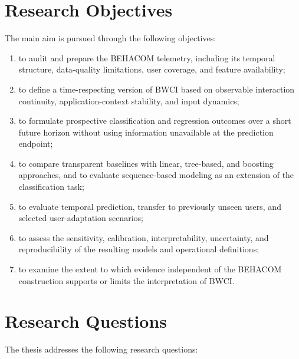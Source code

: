 \section{Research Objectives}
The main aim is pursued through the following objectives:

\begin{enumerate}
    \item to audit and prepare the BEHACOM telemetry, including its temporal structure, data-quality limitations, user coverage, and feature availability;
    
    \item to define a time-respecting version of BWCI based on observable interaction continuity, application-context stability, and input dynamics;

    \item to formulate prospective classification and regression outcomes over a short future horizon without using information unavailable at the prediction endpoint;

    \item to compare transparent baselines with linear, tree-based, and boosting approaches, and to evaluate sequence-based modeling as an extension of the classification task;
    
    \item to evaluate temporal prediction, transfer to previously unseen users, and selected user-adaptation scenarios;

    \item to assess the sensitivity, calibration, interpretability, uncertainty, and reproducibility of the resulting models and operational definitions;

    \item to examine the extent to which evidence independent of the BEHACOM construction supports or limits the interpretation of BWCI.
\end{enumerate}

\section{Research Questions}

The thesis addresses the following research questions:

